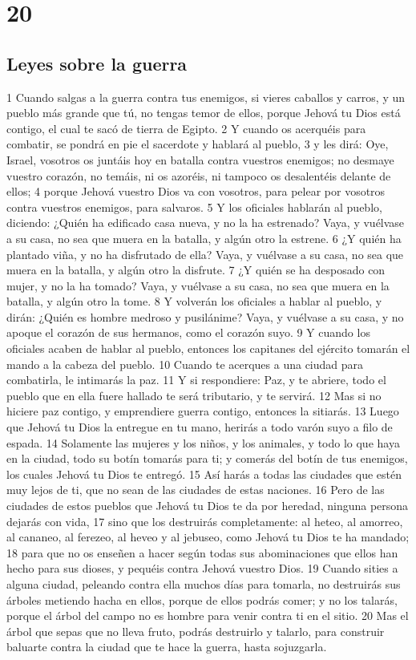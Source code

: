 \chapter{20}

\section{Leyes sobre la guerra}

1 Cuando salgas a la guerra contra tus enemigos, si vieres caballos y carros, y un pueblo más grande que tú, no tengas temor de ellos, porque Jehová tu Dios está contigo, el cual te sacó de tierra de Egipto.
2 Y cuando os acerquéis para combatir, se pondrá en pie el sacerdote y hablará al pueblo,
3 y les dirá: Oye, Israel, vosotros os juntáis hoy en batalla contra vuestros enemigos; no desmaye vuestro corazón, no temáis, ni os azoréis, ni tampoco os desalentéis delante de ellos;
4 porque Jehová vuestro Dios va con vosotros, para pelear por vosotros contra vuestros enemigos, para salvaros.
5 Y los oficiales hablarán al pueblo, diciendo: ¿Quién ha edificado casa nueva, y no la ha estrenado? Vaya, y vuélvase a su casa, no sea que muera en la batalla, y algún otro la estrene.
6 ¿Y quién ha plantado viña, y no ha disfrutado de ella? Vaya, y vuélvase a su casa, no sea que muera en la batalla, y algún otro la disfrute.
7 ¿Y quién se ha desposado con mujer, y no la ha tomado? Vaya, y vuélvase a su casa, no sea que muera en la batalla, y algún otro la tome.
8 Y volverán los oficiales a hablar al pueblo, y dirán: ¿Quién es hombre medroso y pusilánime? Vaya, y vuélvase a su casa, y no apoque el corazón de sus hermanos, como el corazón suyo.
9 Y cuando los oficiales acaben de hablar al pueblo, entonces los capitanes del ejército tomarán el mando a la cabeza del pueblo.
10 Cuando te acerques a una ciudad para combatirla, le intimarás la paz.
11 Y si respondiere: Paz, y te abriere, todo el pueblo que en ella fuere hallado te será tributario, y te servirá.
12 Mas si no hiciere paz contigo, y emprendiere guerra contigo, entonces la sitiarás. 
13 Luego que Jehová tu Dios la entregue en tu mano, herirás a todo varón suyo a filo de espada.
14 Solamente las mujeres y los niños, y los animales, y todo lo que haya en la ciudad, todo su botín tomarás para ti; y comerás del botín de tus enemigos, los cuales Jehová tu Dios te entregó.
15 Así harás a todas las ciudades que estén muy lejos de ti, que no sean de las ciudades de estas naciones.
16 Pero de las ciudades de estos pueblos que Jehová tu Dios te da por heredad, ninguna persona dejarás con vida,
17 sino que los destruirás completamente: al heteo, al amorreo, al cananeo, al ferezeo, al heveo y al jebuseo, como Jehová tu Dios te ha mandado;
18 para que no os enseñen a hacer según todas sus abominaciones que ellos han hecho para sus dioses, y pequéis contra Jehová vuestro Dios.
19 Cuando sities a alguna ciudad, peleando contra ella muchos días para tomarla, no destruirás sus árboles metiendo hacha en ellos, porque de ellos podrás comer; y no los talarás, porque el árbol del campo no es hombre para venir contra ti en el sitio.
20 Mas el árbol que sepas que no lleva fruto, podrás destruirlo y talarlo, para construir baluarte contra la ciudad que te hace la guerra, hasta sojuzgarla.

